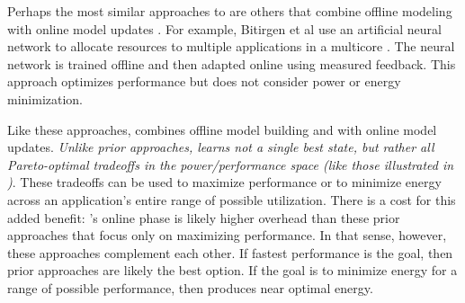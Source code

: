 Perhaps the most similar approaches to \SYSTEM{} are others that
combine offline modeling with online model updates
\cite{ICSE2014,Bitirgen2008,Ipek}.  For example, Bitirgen et al use an
artificial neural network to allocate resources to multiple
applications in a multicore \cite{Bitirgen2008}.  The neural network
is trained offline and then adapted online using measured feedback.
This approach optimizes performance but does not consider power or
energy minimization.  

Like these approaches, \SYSTEM{} combines offline model building and
with online model updates.  \emph{Unlike prior approaches, \SYSTEM{}
  learns not a single best state, but rather all Pareto-optimal
  tradeoffs in the power/performance space (like those illustrated in
  )}.  These tradeoffs can be used to maximize
performance or to minimize energy across an application's entire range
of possible utilization.  There is a cost for this added benefit:
\SYSTEM{}'s online phase is likely higher overhead than these prior
approaches that focus only on maximizing performance.  In that sense,
however, these approaches complement each other.  If fastest
performance is the goal, then prior approaches are likely the best
option.  If the goal is to minimize energy for a range of possible
performance, then \SYSTEM{} produces near optimal energy.
